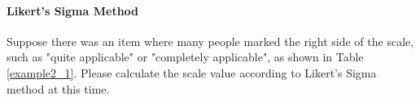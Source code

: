 \documentclass{ltjsbook}
\begin{document}
\paragraph{Likert's Sigma Method} Suppose there was an item where many people marked the right side of the scale, such as "quite applicable" or "completely applicable", as shown in Table \ref{example2_1}. Please calculate the scale value according to Likert's Sigma method at this time.


\end{document}
